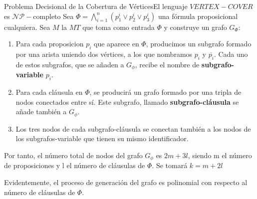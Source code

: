 \documentclass[10pt, envcountsect, presentation, aspectratio=169]{beamer}
\begin{document}
\begin{frame}{Problema Decisional de la Cobertura de Vértices}{El lenguaje $VERTEX-COVER$ es $\mathcal{NP}-$completo }
    Sea $\Phi=\bigwedge_{i=1}^n(p_1^i \vee p_2^i \vee p_3^i)$ una fórmula proposicional cualquiera. Sea $M$ la $MT$ que toma como entrada $\Phi$ y construye un grafo $G_\Phi$:
    \begin{enumerate}
        \item Para cada proposicion $p_i$ que aparece en $\Phi$, producimos un subgrafo formado por una arista uniendo dos vértices, a los que nombramos $p_i$ y $\overline{p_i}$. Cada uno de estos subgrafos, que se añaden a $G_\phi$, recibe el nombre de \textbf{subgrafo-variable }$p_i$.

        \item Para cada cláusula en $\Phi$, se producirá un grafo formado por una tripla de nodos conectados entre sí. Este subgrafo, llamado \textbf{subgrafo-cláusula} se añade también a $G_\phi$.

        \item Los tres nodos de cada subgrafo-cláusula se conectan también a los nodos de los subgrafos-variable que tienen su mismo identificador.
    \end{enumerate}
    Por tanto, el número total de nodos del grafo $G_\phi$ es $2m + 3l$, siendo m el número de proposiciones y l el número de cláusulas de $\Phi$. Se tomará $k = m + 2l$

    Evidentemente, el proceso de generación del grafo es polinomial con respecto al número de cláusulas de $\Phi$.
\end{frame}
\end{document}
